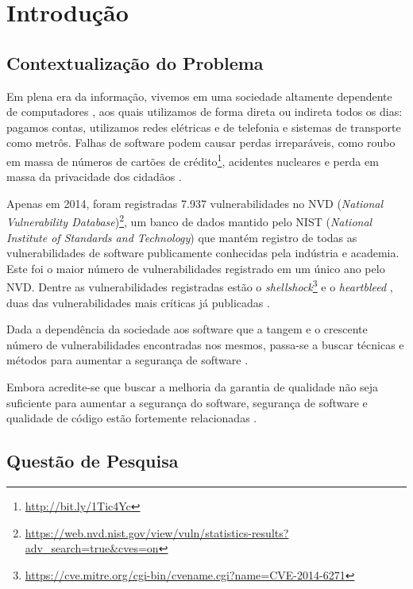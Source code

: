 \chapter*{Introdução} \label{introducao}

\section*{Contextualização do Problema}

Em plena era da informação, vivemos em uma sociedade altamente dependente de computadores \cite{inclusao}, aos quais utilizamos de forma direta ou indireta todos os dias: pagamos contas, utilizamos redes elétricas e de telefonia e sistemas de transporte como metrôs.  Falhas de software podem causar perdas irreparáveis, como roubo em massa de números de cartões de crédito\footnote{\url{http://bit.ly/1Tic4Yc}}, acidentes nucleares \cite{stuxnet} e perda em massa da privacidade dos cidadãos \cite{snowden}.

Apenas em 2014, foram registradas 7.937 vulnerabilidades no NVD (\textit{National Vulnerability Database})\footnote{\url{https://web.nvd.nist.gov/view/vuln/statistics-results?adv_search=true&cves=on}}, um banco de dados mantido pelo NIST (\textit{National Institute of Standards and Technology}) que mantém registro de todas as vulnerabilidades de software publicamente conhecidas pela indústria e academia. Este foi o maior número de vulnerabilidades registrado em um único ano pelo NVD. Dentre as vulnerabilidades registradas estão o \textit{shellshock}\footnote{\url{https://cve.mitre.org/cgi-bin/cvename.cgi?name=CVE-2014-6271}} e o \textit{heartbleed} \cite{heartbleed}, duas das vulnerabilidades mais críticas já publicadas \cite{heartbleed}.

Dada a dependência da sociedade aos software que a tangem e o crescente número de vulnerabilidades encontradas nos mesmos, passa-se a buscar técnicas e métodos para aumentar a segurança de software \cite{sociedade}.

Embora acredite-se que buscar a melhoria da garantia de qualidade não seja suficiente para aumentar a segurança do software, segurança de software e qualidade de código estão fortemente relacionadas \cite{secure_programming}.

\section*{Questão de Pesquisa}

